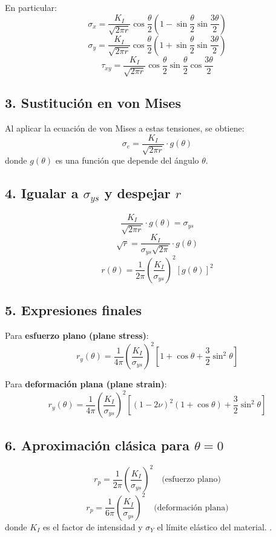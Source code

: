 \documentclass[12pt,letterpaper]{article}
\begin{document}
En particular:
\[
\sigma_x = \frac{K_I}{\sqrt{2\pi r}} \cos\frac{\theta}{2}\left(1-\sin\frac{\theta}{2}\sin\frac{3\theta}{2}\right)
\]
\[
\sigma_y = \frac{K_I}{\sqrt{2\pi r}} \cos\frac{\theta}{2}\left(1+\sin\frac{\theta}{2}\sin\frac{3\theta}{2}\right)
\]
\[
\tau_{xy} = \frac{K_I}{\sqrt{2\pi r}} \cos\frac{\theta}{2}\sin\frac{\theta}{2}\cos\frac{3\theta}{2}
\]

\subsection*{3. Sustitución en von Mises}
Al aplicar la ecuación de von Mises a estas tensiones, se obtiene:
\[
\sigma_e = \frac{K_I}{\sqrt{2\pi r}} \cdot g(\theta)
\]
donde $g(\theta)$ es una función que depende del ángulo $\theta$.

\subsection*{4. Igualar a $\sigma_{ys}$ y despejar $r$}
\[
\frac{K_I}{\sqrt{2\pi r}} \cdot g(\theta) = \sigma_{ys}
\]
\[
\sqrt{r} = \frac{K_I}{\sigma_{ys}\sqrt{2\pi}} \cdot g(\theta)
\]
\[
r(\theta) = \frac{1}{2\pi} \left( \frac{K_I}{\sigma_{ys}} \right)^2 [g(\theta)]^2
\]

\subsection*{5. Expresiones finales}
Para \textbf{esfuerzo plano (plane stress)}:
\begin{equation}
r_y(\theta) = \frac{1}{4\pi} \left( \frac{K_I}{\sigma_{ys}} \right)^2 \left[ 1 + \cos\theta + \frac{3}{2}\sin^2\theta \right]
\label{eq:zona_plastica_esfuerzo_plano}
\end{equation}

Para \textbf{deformación plana (plane strain)}:
\begin{equation}
r_y(\theta) = \frac{1}{4\pi} \left( \frac{K_I}{\sigma_{ys}} \right)^2 \left[ (1 - 2\nu)^2(1 + \cos\theta) + \frac{3}{2}\sin^2\theta \right]
\label{eq:zona_plastica_deformacion_plana}
\end{equation}

\subsection*{6. Aproximación clásica para $\theta = 0$}
\begin{equation}
r_p = \frac{1}{2\pi} \left( \frac{K_I}{\sigma_{ys}} \right)^2 \quad \text{(esfuerzo plano)}
\label{eq:zona_plastica_esfuerzo_plano_clasica}
\end{equation}
\begin{equation}
r_p = \frac{1}{6\pi} \left( \frac{K_I}{\sigma_{ys}} \right)^2 \quad \text{(deformación plana)}
\label{eq:zona_plastica_deformacion_plana_clasica}
\end{equation}
donde $K_I$ es el factor de intensidad y $\sigma_Y$ el límite elástico del material. \cite{Broek1982, Jaramillo2008, Cameron2022, MechanicalBehavior2022, Ponson2022}.
\end{document}
